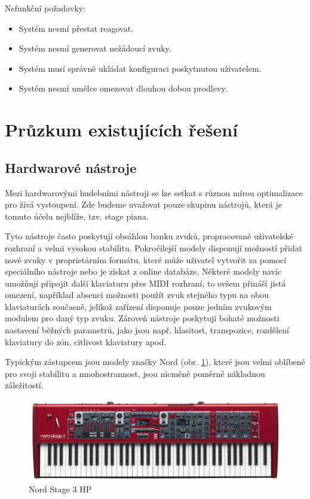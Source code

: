 \documentclass[thesis=M,czech]{FITthesis}[2019/03/06]
\begin{document}
		Nefunkční požadavky:
		\begin{itemize}
			\item Systém nesmí přestat reagovat.
			\item Systém nesmí generovat nežádoucí zvuky.
			\item Systém musí správně ukládat konfiguraci poskytnutou uživatelem.
			\item Systém nesmí umělce omezovat dlouhou dobou prodlevy.
		\end{itemize}
		
	\section{Průzkum existujících řešení}
		\subsection{Hardwarové nástroje}
			Mezi hardwarovými hudebními nástroji se lze setkat s různou mírou optimalizace pro živá vystoupení.
			Zde budeme uvažovat pouze skupinu nástrojů, která je tomuto účelu nejblíže, tzv. stage piana.
			
			Tyto nástroje často poskytují obsáhlou banku zvuků, propracované uživatelské rozhraní a velmi vysokou stabilitu.
			Pokročilejší modely disponují možností přidat nové zvuky v proprietárním formátu, které může uživatel vytvořit za pomocí speciálního nástroje nebo je získat z online databáze. Některé modely navíc umožňují připojit další klaviaturu přes MIDI rozhraní, to ovšem přináší jistá omezení,
			například absenci možnosti použít zvuk stejného typu na obou klaviaturách současně, jelikož zařízení disponuje pouze jedním zvukovým modulem
			pro daný typ zvuku.
			Zároveň nástroje poskytují bohaté možnosti nastavení běžných parametrů, jako jsou např. hlasitost, transpozice, rozdělení klaviatury do zón,
			citlivost klaviatury apod.
			
			Typickým zástupcem jsou modely značky Nord (obr. \ref{fig:HardwareStagepiano}), které jsou velmi oblíbené pro svoji stabilitu a mnohostrannost, jsou nicméně poměrně nákladnou záležitostí.
			
			\begin{figure}[H]
				\centering
				\includegraphics[width=1\textwidth]{HardwareStagepiano}
				\caption[Nord Stage 3 HP]{Nord Stage 3 HP}\label{fig:HardwareStagepiano}
			\end{figure}
\end{document}
